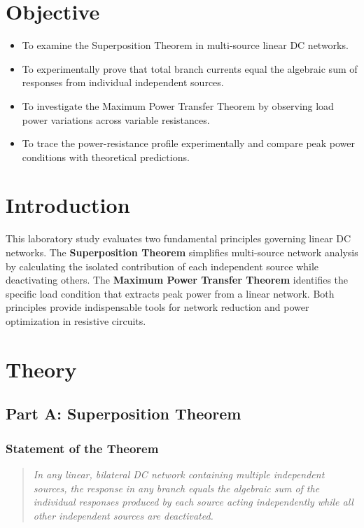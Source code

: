 \section{Objective}
\begin{itemize}
	\item To examine the Superposition Theorem in multi-source linear DC networks.
	\item To experimentally prove that total branch currents equal the algebraic sum of responses from individual independent sources.
	\item To investigate the Maximum Power Transfer Theorem by observing load power variations across variable resistances.
	\item To trace the power-resistance profile experimentally and compare peak power conditions with theoretical predictions.
\end{itemize}

\section{Introduction}
This laboratory study evaluates two fundamental principles governing linear DC networks. The \textbf{Superposition Theorem} simplifies multi-source network analysis by calculating the isolated contribution of each independent source while deactivating others. The \textbf{Maximum Power Transfer Theorem} identifies the specific load condition that extracts peak power from a linear network. Both principles provide indispensable tools for network reduction and power optimization in resistive circuits.

\section{Theory}

\subsection{Part A: Superposition Theorem}

\subsubsection{Statement of the Theorem}
\begin{quote}
	\textit{In any linear, bilateral DC network containing multiple independent sources, the response in any branch equals the algebraic sum of the individual responses produced by each source acting independently while all other independent sources are deactivated.}
\end{quote}

